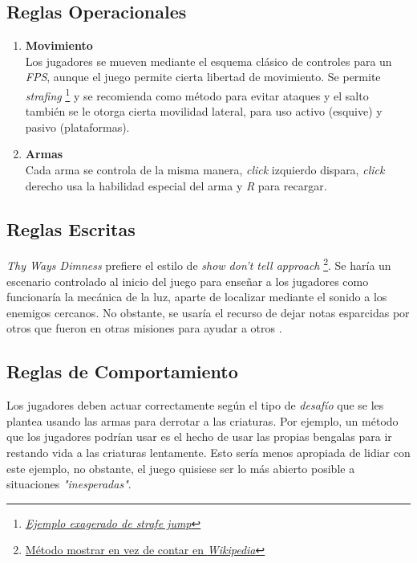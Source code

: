     \subsection{Reglas Operacionales}
        \begin{enumerate}[label=\alph*)]
            \item \textbf{Movimiento} \\
                Los jugadores se mueven mediante el esquema clásico de controles para un \textit{FPS}, aunque el juego permite cierta libertad de movimiento. Se permite \textit{strafing} \footnote{\href{https://www.youtube.com/watch?v=pUIqVz6qZLc}{\textit{Ejemplo exagerado de strafe jump}}} y se recomienda como método para evitar ataques y el salto también se le otorga cierta movilidad lateral, para uso activo (esquive) y pasivo (plataformas).
            \item \textbf{Armas} \\
                Cada arma se controla de la misma manera, \textit{click} izquierdo dispara, \textit{click} derecho usa la habilidad especial del arma y \textit{R} para recargar.
        \end{enumerate}
    \subsection{Reglas Escritas} \label{reglasEscritas}
        \textit{Thy Ways Dimness} prefiere el estilo de \textit{show don't tell approach} \footnote{\href{https://en.wikipedia.org/wiki/Show,_don\%27t_tell}{Método mostrar en vez de contar en \textit{Wikipedia}}}. Se haría un escenario controlado al inicio del juego para enseñar a los jugadores como funcionaría la mecánica de la luz, aparte de localizar mediante el sonido a los enemigos cercanos.
        No obstante, se usaría el recurso de dejar notas esparcidas por otros \hunters que fueron en otras misiones para ayudar a otros \hunters.
    \subsection{Reglas de Comportamiento}
        Los jugadores deben actuar correctamente según el tipo de \textit{desafío} que se les plantea usando las armas para derrotar a las criaturas. Por ejemplo, un método que los jugadores podrían usar es el hecho de usar las propias bengalas para ir restando vida a las criaturas lentamente. Esto sería menos apropiada de lidiar con este ejemplo, no obstante, el juego quisiese ser lo más abierto posible a situaciones \textit{"inesperadas"}.
